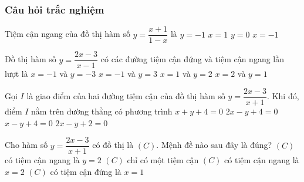 \subsubsection{Câu hỏi trắc nghiệm}
\begin{ex}%
	Tiệm cận ngang của đồ thị hàm số $y=\dfrac{x+1}{1-x}$ là
	\choice
	{\True $y=-1$}
	{$x=1$}
	{$y=0$}
	{$x=-1$}
\end{ex}

\begin{ex}%
	Đồ thị hàm số $y=\dfrac{2x-3}{x-1}$ có các đường tiệm cận đứng và tiệm cận ngang lần lượt là
	\choice
	{$x=-1$ và $y=-3$}
	{$x=-1$ và $y=3$}
	{\True $x=1$ và $y=2$}
	{$x=2$ và $y=1$}
\end{ex}

\begin{ex}%
	Gọi $I$ là giao điểm của hai đường tiệm cận của đồ thị hàm số $y=\dfrac{2x-3}{x+1}$. Khi đó, điểm $I$ nằm trên đường thẳng có phương trình 
	\choice
	{$x+y+4=0$}
	{\True $2x-y+4=0$}
	{$x-y+4=0$}
	{$2x-y+2=0$}
\end{ex}

\begin{ex}%
	Cho hàm số $y=\dfrac{2x-3}{x+1}$ có đồ thị là $(C)$. Mệnh đề nào sau đây là đúng?
	\choice
	{\True $(C)$ có tiệm cận ngang là $y=2$}
	{$(C)$ chỉ có một tiệm cận}
	{$(C)$ có tiệm cận ngang là $x=2$}
	{$(C)$ có tiệm cận đứng là $x=1$}
\end{ex}

